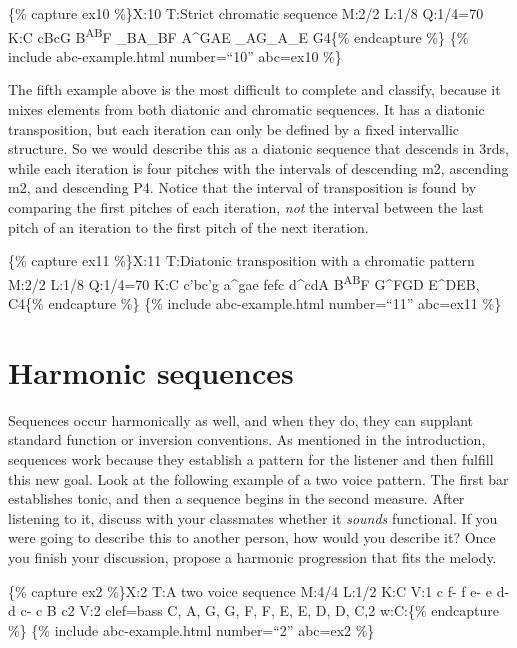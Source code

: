 \documentclass{book}
\begin{document}
\{\% capture ex10 \%\}X:10 T:Strict chromatic sequence M:2/2 L:1/8 Q:1/4=70
K:C cBcG B\textsuperscript{AB}F\textbar{} \_BA\_BF A\^{}GAE\textbar{}
\_AG\_A\_E G4\textbar\textbar\{\% endcapture \%\} \{\% include
abc-example.html number=``10'' abc=ex10 \%\}

The fifth example above is the most difficult to complete and classify,
because it mixes elements from both diatonic and chromatic sequences. It has a
diatonic transposition, but each iteration can only be defined by a fixed
intervallic structure. So we would describe this as a diatonic sequence that
descends in 3rds, while each iteration is four pitches with the intervals of
descending m2, ascending m2, and descending P4. Notice that the interval of
transposition is found by comparing the first pitches of each iteration,
\emph{not} the interval between the last pitch of an iteration to the first
pitch of the next iteration.

\{\% capture ex11 \%\}X:11 T:Diatonic transposition with a chromatic pattern
M:2/2 L:1/8 Q:1/4=70 K:C c'bc'g a\^{}gae\textbar{} fefc d\^{}cdA\textbar{}
B\textsuperscript{AB}F G\^{}FGD\textbar{} E\^{}DEB, C4\textbar\textbar\{\%
endcapture \%\} \{\% include abc-example.html number=``11'' abc=ex11 \%\}

\hypertarget{harmonic-sequences}{%
\section{Harmonic sequences}\label{harmonic-sequences}}

Sequences occur harmonically as well, and when they do, they can supplant
standard function or inversion conventions. As mentioned in the introduction,
sequences work because they establish a pattern for the listener and then
fulfill this new goal. Look at the following example of a two voice pattern.
The first bar establishes tonic, and then a sequence begins in the second
measure. After listening to it, discuss with your classmates whether it
\emph{sounds} functional. If you were going to describe this to another
person, how would you describe it? Once you finish your discussion, propose a
harmonic progression that fits the melody.

\{\% capture ex2 \%\}X:2 T:A two voice sequence M:4/4 L:1/2 K:C V:1 c
f-\textbar{} f e-\textbar{} e d-\textbar{} d c-\textbar{} c B\textbar{}
c2\textbar{]} V:2 clef=bass C, A,\textbar{} G, G,\textbar{} F, F,\textbar{} E,
E,\textbar{} D, D,\textbar{} C,2\textbar{]} w:C:\{\% endcapture \%\} \{\%
include abc-example.html number=``2'' abc=ex2 \%\}
\end{document}
